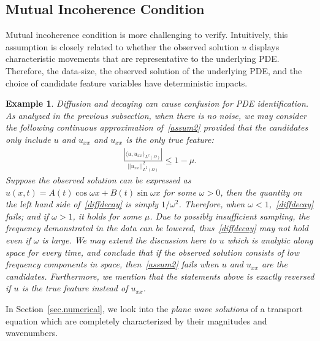 \documentclass[a4paper,11pt]{article}
\newtheorem{example}{Example}[section]
\begin{document}
\subsection{Mutual Incoherence Condition}\label{sec.MIP}
Mutual incoherence condition is more challenging to verify. Intuitively, this assumption is closely related to whether the observed solution $u$ displays characteristic  movements that are representative to the underlying PDE. Therefore, the data-size, the observed solution of the underlying PDE, and the choice of candidate feature variables have deterministic impacts.
\begin{example} Diffusion and decaying can cause confusion for PDE identification. As analyzed in the previous subsection, when there is no noise, we may consider the following continuous approximation of~\eqref{assum2} provided that the candidates only include $u$ and $u_{xx}$ and $u_{xx}$ is the only true feature:  
\begin{align}
\frac{|\langle u,u_{xx}\rangle_{L^2(\Omega)}|}{||u_{xx}||_{L^2(\Omega)}^2}\leq 1-\mu.\label{diffdecay}
\end{align}
Suppose the observed solution can be expressed as $u(x,t)=A(t)\cos \omega x+B(t)\sin \omega x$ for some $\omega>0$, then the quantity on the left hand side of~\eqref{diffdecay} is simply $1/\omega^2$. Therefore, when $\omega< 1$,~\eqref{diffdecay} fails; and if $\omega> 1$, it holds for some $\mu$. Due to possibly insufficient sampling, the frequency demonstrated in the data can be lowered, thus~\eqref{diffdecay} may not hold even if $\omega$ is large. We may extend the discussion here to $u$ which is analytic along space for every time, and conclude that if the observed solution consists of low frequency components in space, then~\eqref{assum2} fails when $u$ and $u_{xx}$ are the candidates. Furthermore, we mention that the statements above is exactly reversed if $u$ is the true feature instead of $u_{xx}$. 
\end{example}
In Section~\ref{sec.numerical}, we look into the \textit{plane wave solutions} of a transport equation which are completely characterized by their magnitudes and wavenumbers.
\end{document}
